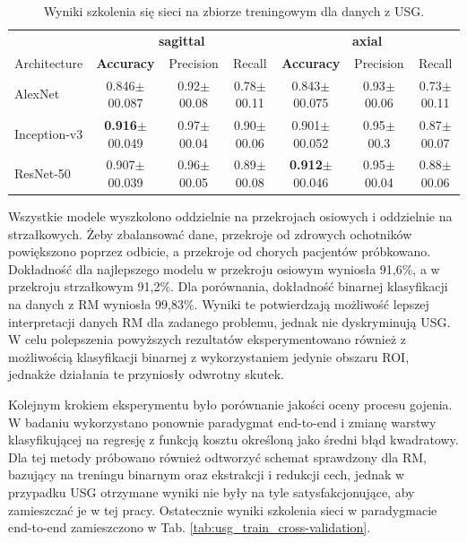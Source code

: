 \begin{table}[]
	\centering
	\setlength{\tabcolsep}{3pt}
	\setlength\extrarowheight{2pt}
	\caption{Wyniki szkolenia się sieci na zbiorze treningowym dla danych z USG.}
	\label{tab:usg-binary}
	\begin{tabular}{l||c|c|c||c|c|c}
		& \multicolumn{3}{c}{\footnotesize{\textbf{sagittal}}} & \multicolumn{3}{c}{\footnotesize{\textbf{axial}}} \\
		Architecture & \textbf{Accuracy} & Precision & Recall & \textbf{Accuracy} & Precision & Recall \\ \hline
		AlexNet & 0.846$\pm$00.087 & 0.92$\pm$00.08 & 0.78$\pm$00.11 & 0.843$\pm$00.075 & 0.93$\pm$00.06 & 0.73$\pm$00.11  \\ \hline
		Inception-v3 & \textbf{0.916}$\pm$00.049 & 0.97$\pm$00.04 & 0.90$\pm$00.06 & 0.901$\pm$00.052 & 0.95$\pm$00.3 & 0.87$\pm$00.07 \\ \hline
		ResNet-50 & 0.907$\pm$00.039 & 0.96$\pm$00.05 & 0.89$\pm$00.08 & \textbf{0.912}$\pm$00.046 & 0.95$\pm$00.04 & 0.88$\pm$00.06 \\ \hline
	\end{tabular}
\end{table}

Wszystkie modele wyszkolono oddzielnie na przekrojach osiowych i oddzielnie na strzałkowych. Żeby zbalansować dane, przekroje od zdrowych ochotników powiększono poprzez odbicie, a przekroje od chorych pacjentów próbkowano. Dokładność dla najlepszego modelu w przekroju osiowym wyniosła 91,6\%, a w przekroju strzałkowym 91,2\%. Dla porównania, dokładność binarnej klasyfikacji na danych z RM wyniosła 99,83\%. Wyniki te potwierdzają możliwość lepszej interpretacji danych RM dla zadanego problemu, jednak nie dyskryminują USG. W celu polepszenia powyższych rezultatów eksperymentowano również z możliwością klasyfikacji binarnej z wykorzystaniem jedynie obszaru ROI, jednakże działania te przyniosły odwrotny skutek.  

Kolejnym krokiem eksperymentu było porównanie jakości oceny procesu gojenia. W badaniu wykorzystano ponownie paradygmat end-to-end i zmianę warstwy klasyfikującej na regresję z funkcją kosztu określoną jako średni błąd kwadratowy. Dla tej metody próbowano również odtworzyć schemat sprawdzony dla RM, bazujący na treningu binarnym oraz ekstrakcji i redukcji cech, jednak w przypadku USG otrzymane wyniki nie były na tyle satysfakcjonujące, aby zamieszczać je w tej pracy. Ostatecznie wyniki szkolenia sieci w paradygmacie end-to-end zamieszczono w Tab. \ref{tab:usg_train_cross-validation}.

